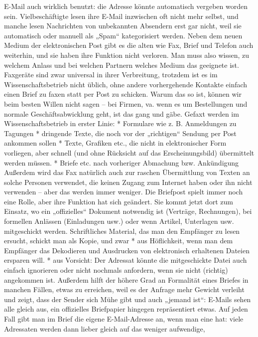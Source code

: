 \documentclass[]{book}
\theoremstyle{definition}
\theoremstyle{definition}
\theoremstyle{definition}
\theoremstyle{remark}
\begin{document}
E-Mail auch wirklich benutzt: die Adresse könnte automatisch vergeben
worden sein. Vielbeschäftigte lesen ihre E-Mail inzwischen oft nicht
mehr selbst, und manche lesen Nachrichten von unbekannten Absendern erst
gar nicht, weil sie automatisch oder manuell als „Spam`` kategorisiert
werden. Neben dem neuen Medium der elektronischen Post gibt es die alten
wie Fax, Brief und Telefon auch weiterhin, und sie haben ihre Funktion
nicht verloren. Man muss also wissen, zu welchem Anlass und bei welchen
Partnern welches Medium das geeignete ist. Faxgeräte sind zwar universal
in ihrer Verbreitung, trotzdem ist es im Wissenschaftsbetrieb nicht
üblich, ohne andere vorhergehende Kontakte einfach einen Brief zu faxen
statt per Post zu schicken. Warum das so ist, können wir beim besten
Willen nicht sagen -- bei Firmen, va. wenn es um Bestellungen und
normale Geschäftsabwicklung geht, ist das gang und gäbe. Gefaxt werden
im Wissenschaftsbetrieb in erster Linie: * Formulare wie z. B.
Anmeldungen zu Tagungen * dringende Texte, die noch vor der „richtigen``
Sendung per Post ankommen sollen * Texte, Grafiken etc., die nicht in
elektronischer Form vorliegen, aber schnell (und ohne Rücksicht auf das
Erscheinungsbild) übermittelt werden müssen. * Briefe etc. nach
vorheriger Abmachung bzw. Ankündigung Außerdem wird das Fax natürlich
auch zur raschen Übermittlung von Texten an solche Personen verwendet,
die keinen Zugang zum Internet haben oder ihn nicht verwenden -- aber
das werden immer weniger. Die Briefpost spielt immer noch eine Rolle,
aber ihre Funktion hat sich geändert. Sie kommt jetzt dort zum Einsatz,
wo ein „offizielles`` Dokument notwendig ist (Verträge, Rechnungen), bei
formellen Anlässen (Einladungen usw.) oder wenn Artikel, Unterlagen usw.
mitgeschickt werden. Schriftliches Material, das man den Empfänger zu
lesen ersucht, schickt man als Kopie, und zwar * aus Höflichkeit, wenn
man dem Empfänger das Dekodieren und Ausdrucken von elektronisch
erhaltenen Dateien ersparen will. * aus Vorsicht: Der Adressat könnte
die mitgeschickte Datei auch einfach ignorieren oder nicht nochmals
anfordern, wenn sie nicht (richtig) angekommen ist. Außerdem hilft der
höhere Grad an Formalität eines Briefes in manchen Fällen, etwas zu
erreichen, weil es der Anfrage mehr Gewicht verleiht und zeigt, dass der
Sender sich Mühe gibt und auch „jemand ist``: E-Mails sehen alle gleich
aus, ein offizielles Briefpapier hingegen repräsentiert etwas. Auf jeden
Fall gibt man im Brief die eigene E-Mail-Adresse an, wenn man eine hat:
viele Adressaten werden dann lieber gleich auf das weniger aufwendige,
\end{document}
